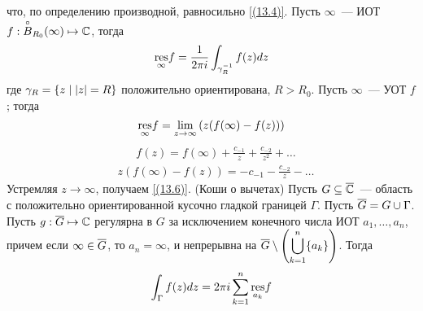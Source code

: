 что, по определению производной, равносильно \eqref{(13.4)}.
\Def
Пусть $\infty$~--- ИОТ $f: \overset{\circ}{B}_{R_0}(\infty) \mapsto \mathbb{C}$, тогда
\begin{equation}\label{(13.5)}
    \underset{\infty}{\mathrm{res}}f = \frac{1}{2\pi i}\int_{\gamma_R^{-1}}f(z)dz
\end{equation}
где $\gamma_R = \left\{{z \mid \left|{z}\right| = R}\right\}$ положительно ориентирована, $R >
R_0$.
\lemma
Пусть $\infty$~--- УОТ $f$; тогда
\begin{equation}\label{(13.6)}
    \underset{\infty}{\mathrm{res}}f = \lim_{z \to \infty} \left( z(f(\infty) - f(z)) \right)
\end{equation}
\pr
\begin{align*}
  & f(z) = f(\infty) + \frac{c_{-1}}{z} + \frac{c_{-2}}{z^2} + \dots
\end{align*}
\begin{align*}
  & z(f(\infty) - f(z)) = -c_{-1} - \frac{c_{-2}}{z} - \dots
\end{align*}
Устремляя $z \to \infty$, получаем \eqref{(13.6)}.
\theorem (Коши о вычетах)
Пусть $G \subseteq \overline{\mathbb{C}}$~--- область с положительно ориентированной кусочно
гладкой границей $\Gamma$. Пусть $\overline{G} = G \cup \Gamma$.
\\
Пусть $g: \overline{G} \mapsto \mathbb{C}$ регулярна в $G$ за исключением конечного числа ИОТ
$a_1, \dots, a_n$, причем если $\infty \in \overline{G}$, то $a_n = \infty$, и
непрерывна на $\overline{G}\setminus \left( \displaystyle \bigcup_{k=1}^n\{a_k\} \right)$.
Тогда
\begin{equation}\label{(13.7)}
    \int_{\Gamma}f(z)dz = 2 \pi i \sum_{k=1}^{n}\underset{a_k}{\mathrm{res}} f
\end{equation}
\pr
